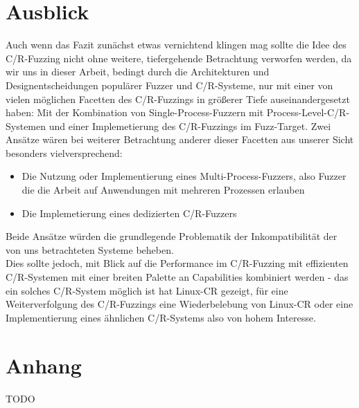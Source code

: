 \documentclass[a4paper]{article}
\begin{document}
\section{Ausblick}
Auch wenn das Fazit zunächst etwas vernichtend klingen mag sollte die Idee des C/R-Fuzzing nicht ohne weitere, tiefergehende Betrachtung verworfen werden, da wir uns in dieser Arbeit, bedingt durch die Architekturen und Designentscheidungen populärer Fuzzer und C/R-Systeme, nur mit einer von vielen möglichen Facetten des C/R-Fuzzings in größerer Tiefe auseinandergesetzt haben: Mit der Kombination von Single-Process-Fuzzern mit Process-Level-C/R-Systemen und einer Implemetierung des C/R-Fuzzings im Fuzz-Target. Zwei Ansätze wären bei weiterer Betrachtung anderer dieser Facetten aus unserer Sicht besonders vielversprechend:
\begin{itemize}
    \item Die Nutzung oder Implementierung eines Multi-Process-Fuzzers, also Fuzzer die die Arbeit auf Anwendungen mit mehreren Prozessen erlauben%
    \item Die Implemetierung eines dedizierten C/R-Fuzzers
\end{itemize}
Beide Ansätze würden die grundlegende Problematik der Inkompatibilität der von uns betrachteten Systeme beheben.\\
Dies sollte jedoch, mit Blick auf die Performance im C/R-Fuzzing mit effizienten C/R-Systemen mit einer breiten Palette an Capabilities kombiniert werden - das ein solches C/R-System möglich ist hat Linux-CR gezeigt, für eine Weiterverfolgung des C/R-Fuzzings eine Wiederbelebung von Linux-CR oder eine Implementierung eines ähnlichen C/R-Systems also von hohem Interesse.

\section{Anhang}
TODO
\end{document}
